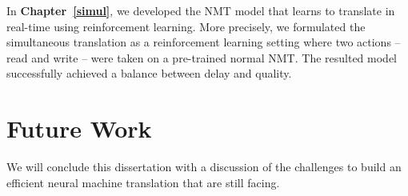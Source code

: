 In \textbf{Chapter~\ref{simul}}, we developed the NMT model that learns to translate in real-time using reinforcement learning. More precisely, we formulated the simultaneous translation as a reinforcement learning setting where two actions -- read and write -- were taken on a pre-trained normal NMT.  The resulted model successfully achieved a balance between delay and quality. 


\section{Future Work}
We will conclude this dissertation with a discussion of the challenges to build an efficient neural machine translation that are still facing. 


